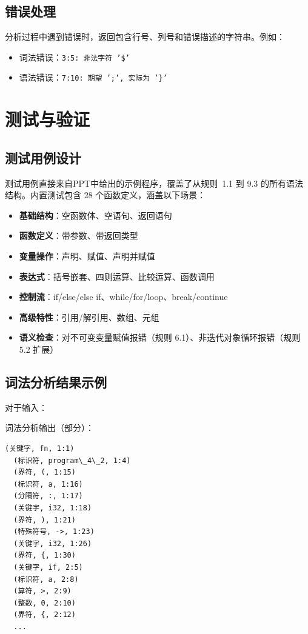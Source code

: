 \documentclass[12pt,a4paper]{ctexart}
\begin{document}
\subsection{错误处理}

分析过程中遇到错误时，返回包含行号、列号和错误描述的字符串。例如：
\begin{itemize}
    \item 词法错误：\texttt{3:5: 非法字符 '\$'}
    \item 语法错误：\texttt{7:10: 期望 ';', 实际为 '\}'}
\end{itemize}


\section{测试与验证}

\subsection{测试用例设计}

测试用例直接来自PPT中给出的示例程序，覆盖了从规则~1.1 到 9.3 的所有语法结构。内置测试包含 28 个函数定义，涵盖以下场景：

\begin{itemize}
    \item \textbf{基础结构}：空函数体、空语句、返回语句
    \item \textbf{函数定义}：带参数、带返回类型
    \item \textbf{变量操作}：声明、赋值、声明并赋值
    \item \textbf{表达式}：括号嵌套、四则运算、比较运算、函数调用
    \item \textbf{控制流}：if/else/else if、while/for/loop、break/continue
    \item \textbf{高级特性}：引用/解引用、数组、元组
    \item \textbf{语义检查}：对不可变变量赋值报错（规则 6.1）、非迭代对象循环报错（规则 5.2 扩展）
\end{itemize}

\subsection{词法分析结果示例}

对于输入：


词法分析输出（部分）：
\begin{lstlisting}[basicstyle=\footnotesize\ttfamily]
  (关键字, fn, 1:1)
  (标识符, program\_4\_2, 1:4)
  (界符, (, 1:15)
  (标识符, a, 1:16)
  (分隔符, :, 1:17)
  (关键字, i32, 1:18)
  (界符, ), 1:21)
  (特殊符号, ->, 1:23)
  (关键字, i32, 1:26)
  (界符, {, 1:30)
  (关键字, if, 2:5)
  (标识符, a, 2:8)
  (算符, >, 2:9)
  (整数, 0, 2:10)
  (界符, {, 2:12)
  ...
\end{lstlisting}
\end{document}
